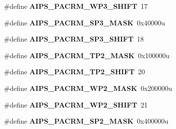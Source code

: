 \begin{DoxyCompactItemize}
\item 
\#define {\bfseries A\+I\+P\+S\+\_\+\+P\+A\+C\+R\+M\+\_\+\+W\+P3\+\_\+\+S\+H\+I\+FT}~17\hypertarget{group__AIPS__Register__Masks_ga146dd3037916720c4f86c5ea5668379d}{}\label{group__AIPS__Register__Masks_ga146dd3037916720c4f86c5ea5668379d}

\item 
\#define {\bfseries A\+I\+P\+S\+\_\+\+P\+A\+C\+R\+M\+\_\+\+S\+P3\+\_\+\+M\+A\+SK}~0x40000u\hypertarget{group__AIPS__Register__Masks_gac60a0419b4cba60bb36772a82aad04de}{}\label{group__AIPS__Register__Masks_gac60a0419b4cba60bb36772a82aad04de}

\item 
\#define {\bfseries A\+I\+P\+S\+\_\+\+P\+A\+C\+R\+M\+\_\+\+S\+P3\+\_\+\+S\+H\+I\+FT}~18\hypertarget{group__AIPS__Register__Masks_ga5d793a831a5ea278d46d9cb639eae572}{}\label{group__AIPS__Register__Masks_ga5d793a831a5ea278d46d9cb639eae572}

\item 
\#define {\bfseries A\+I\+P\+S\+\_\+\+P\+A\+C\+R\+M\+\_\+\+T\+P2\+\_\+\+M\+A\+SK}~0x100000u\hypertarget{group__AIPS__Register__Masks_gad15af493ee1cb5349eb13c39a0f8aaf4}{}\label{group__AIPS__Register__Masks_gad15af493ee1cb5349eb13c39a0f8aaf4}

\item 
\#define {\bfseries A\+I\+P\+S\+\_\+\+P\+A\+C\+R\+M\+\_\+\+T\+P2\+\_\+\+S\+H\+I\+FT}~20\hypertarget{group__AIPS__Register__Masks_gac3e6b0078d445ab5ccef3399bb7d2080}{}\label{group__AIPS__Register__Masks_gac3e6b0078d445ab5ccef3399bb7d2080}

\item 
\#define {\bfseries A\+I\+P\+S\+\_\+\+P\+A\+C\+R\+M\+\_\+\+W\+P2\+\_\+\+M\+A\+SK}~0x200000u\hypertarget{group__AIPS__Register__Masks_gad7134b017c58391217c18adcf22193b7}{}\label{group__AIPS__Register__Masks_gad7134b017c58391217c18adcf22193b7}

\item 
\#define {\bfseries A\+I\+P\+S\+\_\+\+P\+A\+C\+R\+M\+\_\+\+W\+P2\+\_\+\+S\+H\+I\+FT}~21\hypertarget{group__AIPS__Register__Masks_gae090abb4397607dfbc9aed6a3f76196b}{}\label{group__AIPS__Register__Masks_gae090abb4397607dfbc9aed6a3f76196b}

\item 
\#define {\bfseries A\+I\+P\+S\+\_\+\+P\+A\+C\+R\+M\+\_\+\+S\+P2\+\_\+\+M\+A\+SK}~0x400000u\hypertarget{group__AIPS__Register__Masks_gafd46aded4717f92367f67dcb6a2d9997}{}\label{group__AIPS__Register__Masks_gafd46aded4717f92367f67dcb6a2d9997}


\end{DoxyCompactItemize}
